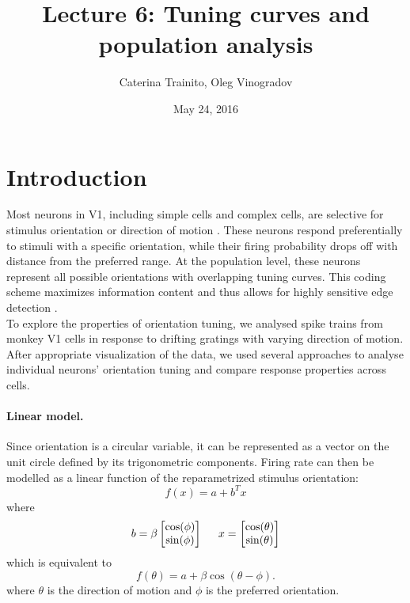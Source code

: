 \documentclass[10pt]{article}
\title{Lecture 6: Tuning curves and population analysis}
\author{Caterina Trainito, Oleg Vinogradov}
\date{May 24, 2016}
\begin{document}
\maketitle

\section*{Introduction}

Most neurons in V1, including simple cells and complex cells, are selective for stimulus orientation or direction of motion \cite{hubel1962receptive}. These neurons respond preferentially to stimuli with a specific orientation, while their firing probability drops off with distance from the preferred range. At the population level, these neurons represent all possible orientations with overlapping tuning curves. This coding scheme maximizes information content \cite{snippe1996parameter} and thus allows for highly sensitive edge detection \cite{marr1980theory}. \\

To explore the properties of orientation tuning, we analysed spike trains from monkey V1 cells in response to drifting gratings with varying direction of motion. After appropriate visualization of the data, we used several approaches to analyse individual neurons' orientation tuning and compare response properties across cells.
\paragraph{Linear model.} Since orientation is a circular variable, it can be represented as a vector on the unit circle defined by its trigonometric components. Firing rate can then be modelled as a linear function of the reparametrized stimulus orientation:
\begin{equation*}
f(x) = a+b^Tx
\end{equation*}
where 
\begin{align*}
b = \beta \begin{bmatrix}
\cos (\phi) \\  \sin (\phi )
 \end{bmatrix}  
 \hspace{5mm}
 x =  \begin{bmatrix}
\cos (\theta) \\
  \sin (\theta)
 \end{bmatrix} 
\end{align*}
which is equivalent to 
\begin{equation*}
f(\theta) = a+ \beta \cos(\theta - \phi).
\end{equation*}
where $\theta$ is the direction of motion and $\phi$ is the preferred orientation.\\
\end{document}
